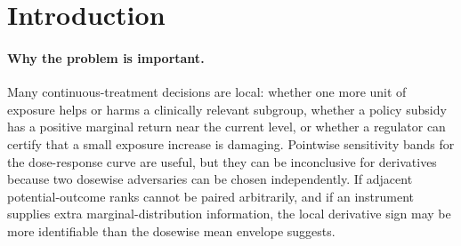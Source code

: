 \documentclass[11pt]{article}
\theoremstyle{definition}
\theoremstyle{plain}
\theoremstyle{remark}
\begin{document}
\begin{abstract}
Continuous-dose sensitivity analyses now give sharp pointwise bands for average potential outcomes under hidden confounding, but local scientific questions often concern the sign of a marginal dose-response derivative.  This proposal asks whether a continuous instrument plus a bounded adjacent-rank copula tube can certify the sign of a baseline-rank-slice finite difference even when the two one-dose rank-slice marginal bands overlap enough to leave the ordinary marginal slope sign ambiguous.  The routine theorem is a finite sharp-bounds representation: after discretizing the adjacent rank slice and the instrument support, the identified slope interval is the projection of one joint coupling problem rather than a product of dosewise rank-slice intervals.  The flagship conjecture is that the adjacent-rank copula creates a strict sign phase transition: for small enough copula radius \(\rho\) and informative enough IV moment tolerance \(\eta\), the sharp lower slope bound is positive although the one-dose rank-slice slope interval straddles zero.  Resolving this would turn rank-dependence information into an auditable local derivative-sign certificate for continuous treatments under unmeasured confounding.
\end{abstract}

\section{Introduction}
\paragraph{Why the problem is important.}
Many continuous-treatment decisions are local: whether one more unit of exposure helps or harms a clinically relevant subgroup, whether a policy subsidy has a positive marginal return near the current level, or whether a regulator can certify that a small exposure increase is damaging.  Pointwise sensitivity bands for the dose-response curve are useful, but they can be inconclusive for derivatives because two dosewise adversaries can be chosen independently.  If adjacent potential-outcome ranks cannot be paired arbitrarily, and if an instrument supplies extra marginal-distribution information, the local derivative sign may be more identifiable than the dosewise mean envelope suggests.
\end{document}
